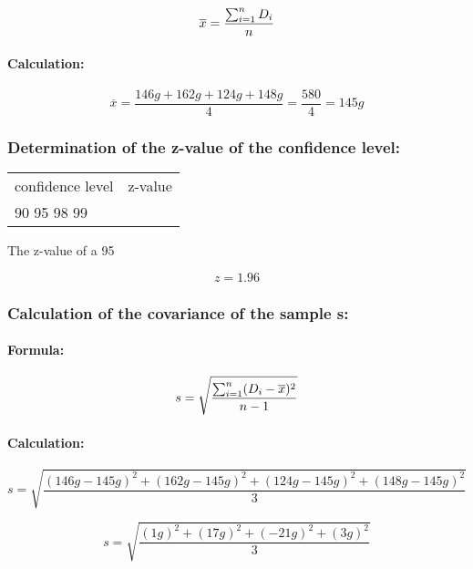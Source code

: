 \documentclass[a4paper,13pt,twoside]{book}
\begin{document}
$$
\overline{x} =
\frac
{\sum_{i=1}^{\\n} D_i}
{n}
$$

\paragraph{Calculation:}

$$
\overline{x} =
\frac
{146 g + 162 g + 124 g + 148 g}
{4} =
\frac
{580}
{4} =
145 g
$$



\subsubsection{Determination of the z-value of the confidence level:}

\begin{tabular}{ll}
confidence level & z-value \\
90%
95%
98%
99%
\end{tabular}

The z-value of a 95 %

$$
z = 1.96
$$



\subsubsection{Calculation of the covariance of the sample s:}

\paragraph{Formula:}

$$
s =
\sqrt
{
\frac
{\sum_{i=1}^{\\n} (D_i - \overline{x})^{2}}
{n - 1}
}
$$

\paragraph{Calculation:}

$$
s =
\sqrt
{
\frac
{
(146 g - 145 g)^{2} +
(162 g - 145 g)^{2} +
(124 g - 145 g)^{2} +
(148 g - 145 g)^{2}
}
{3}
}
$$

$$
s =
\sqrt
{
\frac
{
(1    g)^{2} +
(17   g)^{2} +
(- 21 g)^{2} +
(3    g)^{2}
}
{3}
}
$$
\end{document}
